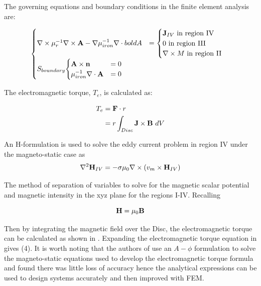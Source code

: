 \documentclass[lettersize,journal]{IEEEtran}
\begin{document}
The governing equations and boundary conditions in the finite element analysis are:


\begin{equation}
\begin{aligned} 
\begin{cases}
\nabla \times \mu_r^{-1}\nabla\times \bold{A}-\nabla\mu_{iron}^{-1}\nabla\cdot bold{A}&= \begin{aligned}
\begin{cases}
\bold{J}_{IV}\ \mathrm{in\ region\ IV}\\0\ \mathrm{in\ region\ III}\\\nabla\times M\ \mathrm{in\ region\ II}
\end{cases}
\end{aligned}\\
S_{boundary}
\begin{aligned}
\begin{cases}
\bold{A}\times \bold{n} &= 0\\
\mu_{iron}^{-1}\nabla\cdot \bold{A} &= 0
\end{cases} 
\end{aligned}
\end{cases}
\end{aligned}

\end{equation}

The electromagnetic torque, $T_e$, is calculated as:

\begin{equation}
\begin{aligned}
T_e &= \bold{F}\cdot r\\
&= r\int_{Disc}\bold{J} \times \bold{B}\ dV
\end{aligned}
\end{equation}


An H-formulation is used to solve the eddy current problem in region IV under the magneto-static case as 
\begin{equation}
 \nabla^{2}\bold{H}_{IV}=-\sigma\mu_0\nabla\times(v_m \times \bold{H}_{IV})   
\end{equation}

The method of separation of variables to solve for the magnetic scalar potential and magnetic intensity in the xyz plane for the regions I-IV\cite{Lu2021-lr}.
Recalling

\begin{equation}
\bold{H} = \mu_0\bold{B}
\end{equation}

Then by integrating the magnetic field over the Disc, the electromagnetic torque can be calculated as shown in \cite{Lu2021-lr}. Expanding the electromagnetic torque equation in \cite{Lu2021-lr} gives (4). It is worth noting that the authors of \cite{fontchastagner_2018_design} use an $A-\phi$ formulation to solve the magneto-static equations used to develop the electromagnetic torque formula and found there was little loss of accuracy hence the analytical expressions can be used to design systems accurately and then improved with FEM.



\end{document}
